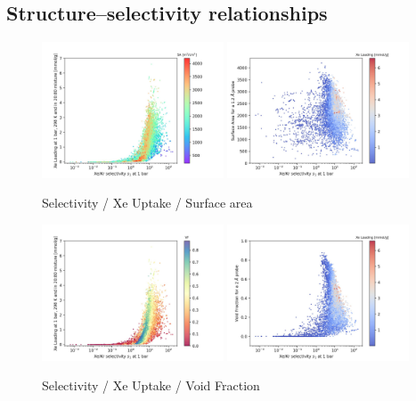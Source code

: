 \documentclass[main]{subfiles}
\begin{document}
\subsection{Structure--selectivity relationships}




\begin{figure}[ht]
  \centering
  \includegraphics[width=0.48\textwidth]{figures/2-thermo/Scatterplot_uptake_selectivity_sa.jpg}
  \includegraphics[width=0.48\textwidth]{figures/2-thermo/Scatterplot_sa_selectivity.jpg}
  \caption{Selectivity / Xe Uptake / Surface area}
\end{figure}

\begin{figure}[ht]
  \centering
  \includegraphics[width=0.48\textwidth]{figures/2-thermo/Scatterplot_uptake_selectivity_vol.jpg}
  \includegraphics[width=0.48\textwidth]{figures/2-thermo/Scatterplot_vol_selectivity.jpg}
  \caption{Selectivity / Xe Uptake / Void Fraction}
\end{figure}
\end{document}
